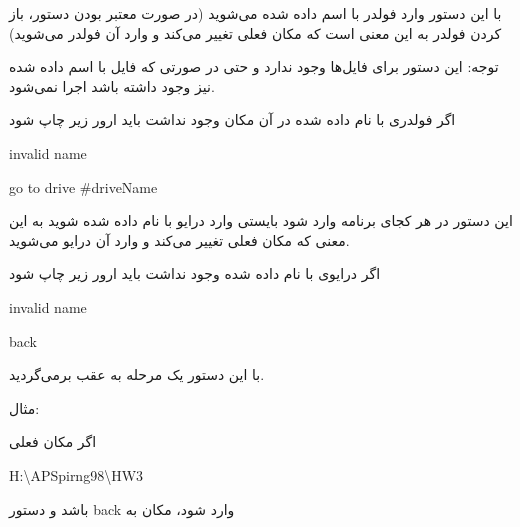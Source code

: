 \documentclass[]{article}
\begin{document}
با این دستور وارد فولدر با اسم داده شده می‌شوید (در صورت معتبر بودن دستور، باز کردن فولدر به این معنی است که مکان فعلی تغییر می‌کند و وارد آن فولدر می‌شوید)


توجه: این دستور برای فایل‌ها وجود ندارد و حتی در صورتی که فایل با اسم داده شده نیز وجود داشته باشد اجرا نمی‌شود.


اگر فولدری با نام داده شده در آن مکان وجود نداشت باید ارور زیر چاپ شود
\begin{tcolorbox}[boxrule=0pt]
	\begin{latin}
  	  \large{
  	  	invalid name
		}
	\end{latin}
\end{tcolorbox}




\begin{tcolorbox}[boxrule=0pt]
	\begin{latin}
  	  \large{
  	  	go to drive \#driveName
		}
	\end{latin}
\end{tcolorbox}
این دستور در هر کجای برنامه وارد شود بایستی وارد درایو با نام داده شده شوید به این معنی که مکان فعلی تغییر می‌کند و وارد آن درایو می‌شوید.

اگر درایوی با نام داده شده وجود نداشت باید ارور زیر چاپ شود

\begin{tcolorbox}[boxrule=0pt]
	\begin{latin}
  	  \large{
  	  	invalid name
		}
	\end{latin}
\end{tcolorbox}




\begin{tcolorbox}[boxrule=0pt]
	\begin{latin}
  	  \large{
  	  	back
		}
	\end{latin}
\end{tcolorbox}


با این دستور یک مرحله به عقب برمی‌گردید.

مثال:


اگر مکان فعلی

\begin{tcolorbox}[boxrule=0pt]
	\begin{latin}
  	  \large{
  	  	 H:\textbackslash APSpirng98\textbackslash HW3
		}
	\end{latin}
\end{tcolorbox}

 
  باشد و دستور back وارد شود، مکان به
  
\end{document}
